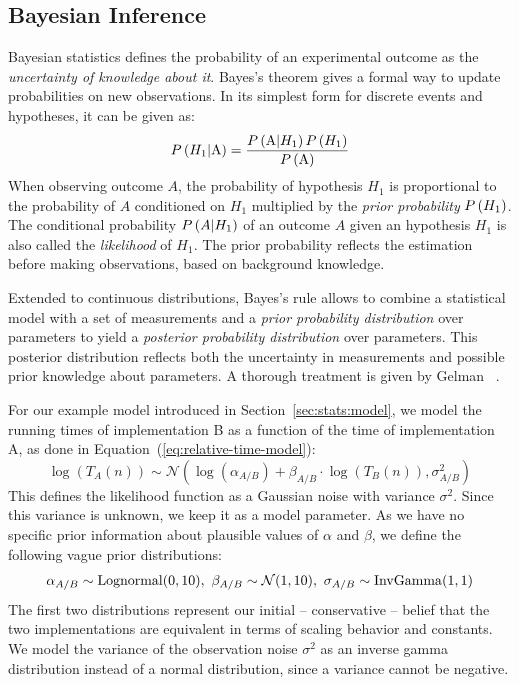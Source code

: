 \documentclass[algorithms,article,submit,moreauthors,pdftex]{Definitions/mdpi}
\newcommand{\changed}[1]{#1}
\begin{document}
\subsection{Bayesian Inference}
\label{sec:stats:bayesian-inference}
Bayesian statistics defines the probability of an experimental outcome as the \emph{uncertainty of knowledge about it}.
Bayes's theorem gives a formal way to update probabilities on new observations.
In its simplest form for discrete events and hypotheses, it can be given as:
%
\begin{equation}
 {P}\left(H_1 | \text{A}\right) = \frac{{P}\left(\text{A} | H_1\right){P}\left(H_1\right)}{ {P}\left(\text{A}\right)}
 \label{eq:bayes-rule}
\end{equation}
%
When observing outcome $A$, the probability of hypothesis $H_1$ is proportional to the probability of $A$ conditioned on $H_1$ multiplied by the \emph{prior probability} ${P}\left(H_1\right)$.
The conditional probability ${P}\left(A | H_1\right)$ of an outcome $A$ given an hypothesis $H_1$ is also called the \emph{likelihood} of $H_1$.
The prior probability reflects the estimation before making observations, based on background knowledge.

Extended to continuous distributions, Bayes's rule allows to combine a statistical model with a set of measurements and a \emph{prior probability distribution} over parameters to yield a \emph{posterior probability distribution} over parameters.
This posterior distribution reflects both the uncertainty in measurements and possible prior knowledge about parameters.
A thorough treatment is given by Gelman \etal~\cite{gelman2013bayesian}.

For our example model introduced in Section~\ref{sec:stats:model}, we model the running times of implementation B as a function of the time of implementation A, as done in Equation~(\ref{eq:relative-time-model}):
\[
\log(T_A(n)) \sim \mathcal{N}(\changed{\log}(\alpha_{A/B}) + \beta_{A/B} \cdot \log(T_B(n)), \sigma_{A/B}^2)
\]
%
This defines the likelihood function as a Gaussian noise with variance $\sigma^2$.
Since this variance is unknown, we keep it as a model parameter.
%
As we have no specific prior information about plausible values of $\alpha$ and $\beta$, we define the following vague prior distributions:
%
\begin{align*}
 \alpha_{A/B} \sim \changed{\mathrm{Lognormal}}(0,10),\
 \beta_{A/B} \sim \mathcal{N}(1,10),\
 \sigma_{A/B} \sim \mathrm{Inv\-Gamma}(1,1)
\end{align*}
%
The first two distributions represent our initial -- conservative -- belief that the two implementations are equivalent in terms of scaling behavior and constants.
We model the variance of the observation noise $\sigma^2$ as an inverse gamma distribution instead of a normal distribution, since a variance cannot be negative.
\end{document}
